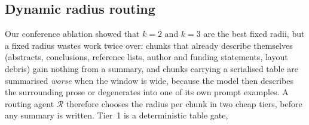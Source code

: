 \documentclass[pdflatex,sn-mathphys-num]{sn-jnl}
\theoremstyle{thmstyleone}%
\theoremstyle{thmstylethree}%
\begin{document}
\subsection{Dynamic radius routing}\label{sec:router}

Our conference ablation \cite{sandor2025documentslicecontextualretrieval} showed that $k=2$ and $k=3$ are the best fixed radii, but a fixed radius wastes work twice over: chunks that already describe themselves (abstracts, conclusions, reference lists, author and funding statements, layout debris) gain nothing from a summary, and chunks carrying a serialised table are summarised \emph{worse} when the window is wide, because the model then describes the surrounding prose or degenerates into one of its own prompt examples. A routing agent $\mathcal R$ therefore chooses the radius per chunk in two cheap tiers, before any summary is written. Tier~1 is a deterministic table gate,
\end{document}
